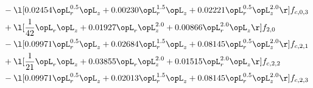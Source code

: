 \begin{alignat}{2}
& - \l[  0.02454 \opL_r^{0.5} \opL_z +  0.00230 \opL_r^{1.5} \opL_z +  0.02221 \opL_r^{0.5} \opL_z^{2.0}  \r] f_{c,0,3} \nonumber \\ 
& + \l[ \frac{1}{42} \opL_r \opL_z +  0.01927 \opL_r \opL_z^{2.0} +  0.00866 \opL_r^{2.0} \opL_z  \r] f_{2,0} \nonumber \\ 
& - \l[  0.09971 \opL_r^{0.5} \opL_z +  0.02684 \opL_r^{1.5} \opL_z +  0.08145 \opL_r^{0.5} \opL_z^{2.0}  \r] f_{c,2,1} \nonumber \\ 
& + \l[ \frac{1}{21} \opL_r \opL_z +  0.03855 \opL_r \opL_z^{2.0} +  0.01515 \opL_r^{2.0} \opL_z  \r] f_{c,2,2} \nonumber \\ 
& - \l[  0.09971 \opL_r^{0.5} \opL_z +  0.02013 \opL_r^{1.5} \opL_z +  0.08145 \opL_r^{0.5} \opL_z^{2.0}  \r] f_{c,2,3} \nonumber \\ 
\end{alignat} 


